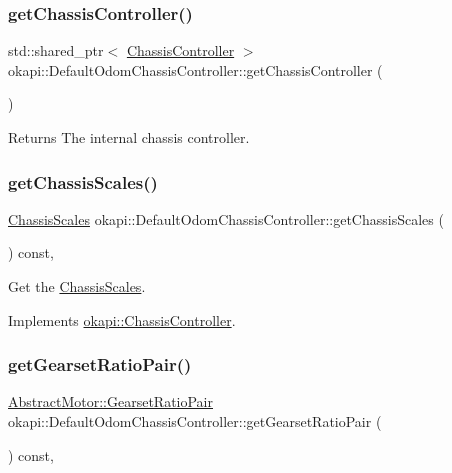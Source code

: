 \subsubsection{\texorpdfstring{getChassisController()}{getChassisController()}}
{\footnotesize\ttfamily std\+::shared\+\_\+ptr$<$ \mbox{\hyperlink{classokapi_1_1ChassisController}{Chassis\+Controller}} $>$ okapi\+::\+Default\+Odom\+Chassis\+Controller\+::get\+Chassis\+Controller (\begin{DoxyParamCaption}{ }\end{DoxyParamCaption})}

\begin{DoxyReturn}{Returns}
The internal chassis controller. 
\end{DoxyReturn}
\mbox{\label{classokapi_1_1DefaultOdomChassisController_afa07913b30d47c790fcdce8c2b85a468}} 
\subsubsection{\texorpdfstring{getChassisScales()}{getChassisScales()}}
{\footnotesize\ttfamily \mbox{\hyperlink{classokapi_1_1ChassisScales}{Chassis\+Scales}} okapi\+::\+Default\+Odom\+Chassis\+Controller\+::get\+Chassis\+Scales (\begin{DoxyParamCaption}{ }\end{DoxyParamCaption}) const\hspace{0.3cm}{\ttfamily [override]}, {\ttfamily [virtual]}}

Get the \mbox{\hyperlink{classokapi_1_1ChassisScales}{Chassis\+Scales}}. 

Implements \mbox{\hyperlink{classokapi_1_1ChassisController_a0a8e32fc7adad8567f550954505aaa06}{okapi\+::\+Chassis\+Controller}}.

\mbox{\label{classokapi_1_1DefaultOdomChassisController_a6912dbe99776f79fb3a6990e2fbea2ff}} 
\subsubsection{\texorpdfstring{getGearsetRatioPair()}{getGearsetRatioPair()}}
{\footnotesize\ttfamily \mbox{\hyperlink{structokapi_1_1AbstractMotor_1_1GearsetRatioPair}{Abstract\+Motor\+::\+Gearset\+Ratio\+Pair}} okapi\+::\+Default\+Odom\+Chassis\+Controller\+::get\+Gearset\+Ratio\+Pair (\begin{DoxyParamCaption}{ }\end{DoxyParamCaption}) const\hspace{0.3cm}{\ttfamily [override]}, {\ttfamily [virtual]}}

